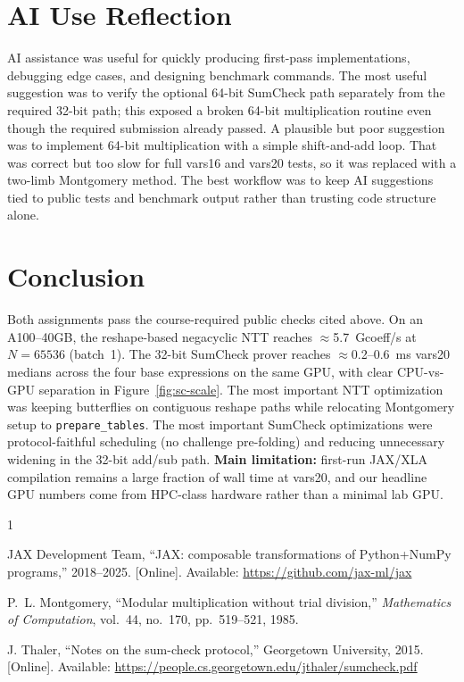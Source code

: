 \documentclass[conference]{IEEEtran}
\begin{document}
\section{AI Use Reflection}
AI assistance was useful for quickly producing first-pass implementations,
debugging edge cases, and designing benchmark commands. The most useful
suggestion was to verify the optional 64-bit SumCheck path separately from the
required 32-bit path; this exposed a broken 64-bit multiplication routine even
though the required submission already passed. A plausible but poor suggestion
was to implement 64-bit multiplication with a simple shift-and-add loop. That
was correct but too slow for full vars16 and vars20 tests, so it was replaced
with a two-limb Montgomery method. The best workflow was to keep AI suggestions
tied to public tests and benchmark output rather than trusting code structure
alone.

\section{Conclusion}
Both assignments pass the course-required public checks cited above. On an
A100--40GB, the reshape-based negacyclic NTT reaches $\approx$5.7~Gcoeff/s at
$N{=}65536$ (batch~1). The 32-bit SumCheck prover reaches $\approx$0.2--0.6~ms
vars20 medians across the four base expressions on the same GPU, with clear
CPU-vs-GPU separation in Figure~\ref{fig:sc-scale}. The most important NTT
optimization was keeping butterflies on contiguous reshape paths while
relocating Montgomery setup to \texttt{prepare\_tables}. The most important
SumCheck optimizations were protocol-faithful scheduling (no challenge
pre-folding) and reducing unnecessary widening in the 32-bit add/sub path.
\textbf{Main limitation:} first-run JAX/XLA compilation remains a large fraction
of wall time at vars20, and our headline GPU numbers come from HPC-class
hardware rather than a minimal lab GPU.

\begin{thebibliography}{1}

JAX Development Team, ``{JAX}: composable transformations of {P}ython+{N}um{P}y programs,'' 2018--2025. [Online]. Available: \url{https://github.com/jax-ml/jax}

P.~L. Montgomery, ``Modular multiplication without trial division,''
\textit{Mathematics of Computation}, vol.~44, no.~170, pp.~519--521, 1985.

J. Thaler, ``Notes on the sum-check protocol,'' Georgetown University, 2015.
[Online]. Available: \url{https://people.cs.georgetown.edu/jthaler/sumcheck.pdf}

\end{thebibliography}
\end{document}
